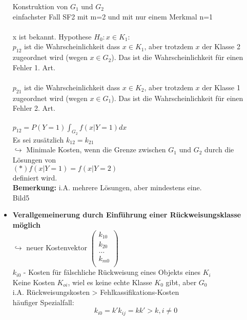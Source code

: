 \documentclass[a4paper,12pt]{scrreprt}
\newcommand{\Nb}[1]{\textbf{#1}}
\newcommand{\itemd}[1]{\item{\textbf{#1}} }
\begin{document}
\begin{itemize}
		Konstruktion von $G_1$ und $G_2$\\
		einfachster Fall SF2 mit m=2 und mit nur einem Merkmal n=1\\
		\\
		x ist bekannt. Hypothese $H_0: x\in K_1$:\\
		$p_{12}$ ist die Wahrscheinlichkeit dass $x\in K_1$, aber
		trotzdem $x$ der Klasse 2 zugeordnet wird (wegen $x\in G_2$).
		Das ist die Wahrscheinlichkeit für einen Fehler 1. Art.\\
		\\
		$p_{21}$ ist die Wahrscheinlichkeit dass $x\in K_2$, aber
		trotzdem $x$ der Klasse 1 zugeordnet wird (wegen $x\in G_1$).
		Das ist die Wahrscheinlichkeit für einen Fehler 2. Art.\\
		\\
		$p_{12} = P(Y=1) \int_{G_2} f(x| Y = 1 ) dx $\\
		Es sei zusätzlich $k_{12} = k_{21}$\\
		$ \hookrightarrow $ Minimale Kosten, wenn die Grenze zwischen $G_1$ und $ G_2$ durch die Lösungen von \\
		$(*) f(x|Y=1) = f (x| Y=2)$\\
		definiert wird.\\
		\Nb{Bemerkung:} i.A. mehrere Lösungen, aber mindestens eine.\\
		
		Bild5
	
	\itemd{Verallgemeinerung durch Einführung einer Rückweisungsklasse möglich}\\
	$\hookrightarrow$ neuer Kostenvektor $(\begin{array}{ l}
	                                       k_{10}\\
	                                       k_{20}\\
	                                       \dots\\
	                                       k_{m0}\\
	                                     \end{array})$ \\
	$k_{i0}$ - Kosten für fälschliche Rückweisung eines Objekts eines $K_i$\\
	Keine Kosten $K_{oi}$, wiel es keine echte Klasse $K_0$ gibt, aber $G_0$\\
	i.A. Rückweisungskosten > Fehlkassifikations-Kosten\\
	häufiger Spezialfall:\\
	$$ k_{i0} = k'    k_{ij} = k     k' > k , i \neq 0 $$
	

\end{itemize}
\end{document}
